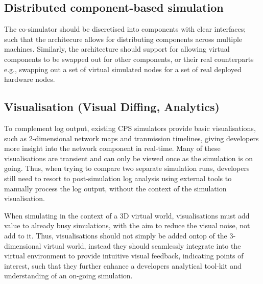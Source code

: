 \subsection{Distributed component-based simulation} %
\label{sub:distributed}
The co-simulator should be discretised into components with clear interfaces; such that the architecure allows for distributing components across multiple machines. Similarly, the architecture should support for allowing virtual components to be swapped out for other components, or their real counterparts e.g., swapping out a set of virtual simulated nodes for a set of real deployed hardware nodes.



\subsection{Visualisation (Visual Diffing, Analytics)}
\label{sub:requirements_Visualisation}
To complement log output, existing CPS simulators provide basic visualisations, such as 2-dimensional network maps and tranmission timelines, giving developers more insight into the network component in real-time. Many of these visualisations are transient and can only be viewed once as the simulation is on going. Thus, when trying to compare two separate simulation runs, developers still need to resort to post-simulation log analysis using external tools to manually process the log output, without the context of the simulation visualisation. 

When simulating in the context of a 3D virtual world, visualisations must add value to already busy simulations, with the aim to reduce the visual noise, not add to it. Thus, visualisations should not simply be added ontop of the 3-dimensional virtual world, instead they should seamlessly integrate into the virtual environment to provide intuitive visual feedback, indicating points of interest, such that they further enhance a developers analytical tool-kit and understanding of an on-going simulation. 

